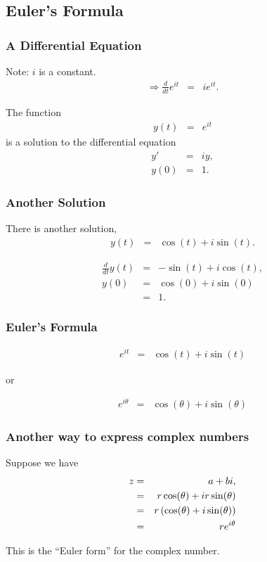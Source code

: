 \subsection{Euler's Formula}

\begin{frame}
  \frametitle{A Differential Equation}

  Note: $i$ is a constant.
  \begin{eqnarray*}
    \Rightarrow \frac{d}{dt} e^{it} & = & i e^{it}.
  \end{eqnarray*}

  The function
  \begin{eqnarray*}
    y(t) & = & e^{it}
  \end{eqnarray*}
  is a solution to the differential equation
  \begin{eqnarray*}
    y' & = & iy, \\
    y(0) & = & 1.
  \end{eqnarray*}

\end{frame}

\begin{frame}
  \frametitle{Another Solution}

  There is another solution,
  \begin{eqnarray*}
    y(t) & = & \cos(t) + i \sin(t).
  \end{eqnarray*}

  \begin{eqnarray*}
    \frac{d}{dt} y(t) & = & -\sin(t) + i \cos(t), \\
    y(0) & = & \cos(0) + i\sin(0) \\
    & = & 1.
  \end{eqnarray*}

\end{frame}


\begin{frame}
  \frametitle{Euler's Formula}

  \begin{eqnarray*}
    e^{it} & = & \cos(t) + i\sin(t)
  \end{eqnarray*}

  or

  \begin{eqnarray*}
    e^{i\theta} & = & \cos(\theta) + i\sin(\theta)
  \end{eqnarray*}
  
\end{frame}

\begin{frame}
  \frametitle{Another way to express complex numbers}

  Suppose we have
  \begin{eqnarray*}
    z & = & a + bi, \\
    & = & r\cos(\theta) + ir\sin(\theta) \\
    & = & r \left( \cos(\theta) + i\sin(\theta) \right) \\
    & = & r e^{i\theta}
  \end{eqnarray*}

  This is the ``Euler form'' for the complex number.

\end{frame}

